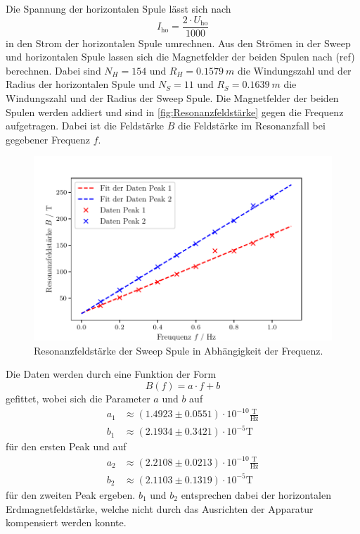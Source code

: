 \newpage
\noindent
Die Spannung der horizontalen Spule lässt sich nach 
\begin{equation}
  I_{\text{ho}} = \frac{2 \cdot U_{\text{ho} }}{1000}
\end{equation}
in den Strom der horizontalen Spule umrechnen. Aus den Strömen in der Sweep und horizontalen Spule lassen sich die Magnetfelder der beiden Spulen nach (ref) berechnen.
Dabei sind $N_H = 154$ und $R_H = \SI{0.1579}{m}$ die Windungszahl und der Radius der horizontalen Spule und $N_S = 11$ und $R_S = \SI{0.1639}{m}$ die Windungszahl und der Radius der Sweep Spule.
Die Magnetfelder der beiden Spulen werden addiert und sind in \autoref{fig:Resonanzfeldstärke} gegen die Frequenz aufgetragen. Dabei ist die Feldstärke $B$ die Feldstärke im Resonanzfall bei gegebener Frequenz $f$.
\begin{figure}[H]
  \centering
  \includegraphics[width=0.8\linewidth]{build/plot1.pdf}
  \caption{Resonanzfeldstärke der Sweep Spule in Abhängigkeit der Frequenz.}
  \label{fig:Resonanzfeldstärke}
\end{figure}
\noindent
Die Daten werden durch eine Funktion der Form 
\begin{equation}
  B(f) = a \cdot f + b
\end{equation}
gefittet, wobei sich die Parameter $a$ und $b$ auf
\begin{align*}
  a_1 &\approx \left(1.4923 \pm  0.0551 \right) \cdot 10^{-10} \frac{\mathrm{T}}{\mathrm{Hz}}\\
  b_1 &\approx \left(2.1934 \pm 0.3421 \right) \cdot 10^{-5} \mathrm{T}
\end{align*}
für den ersten Peak und auf 
\begin{align*}
  a_2 &\approx \left(2.2108 \pm  0.0213 \right) \cdot 10^{-10} \frac{\mathrm{T}}{\mathrm{Hz}}\\
  b_2 &\approx \left(2.1103 \pm 0.1319 \right) \cdot 10^{-5} \mathrm{T}
\end{align*}
für den zweiten Peak ergeben. $b_1$ und $b_2$ entsprechen dabei der horizontalen Erdmagnetfeldstärke, welche nicht durch das Ausrichten der Apparatur kompensiert werden konnte.
